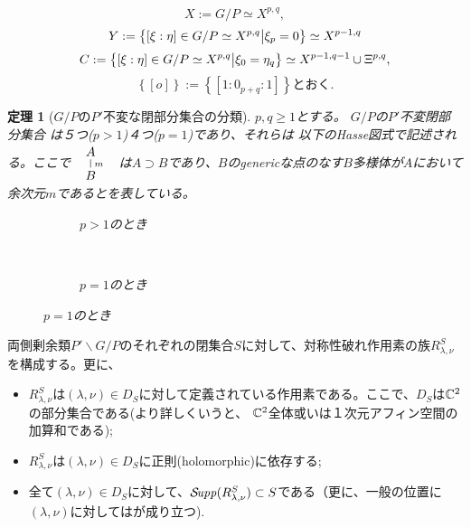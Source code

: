 \documentclass[12pt]{article} %
\newtheorem{theorem}{定理}
\newcommand{\Supp}{\mathcal{S}\!{\it upp}}
\theoremstyle{definition}
\theoremstyle{exampstyle} \newtheorem{examp}[theorem]{Theorem}
\newcommand{\doubt}[1]{\uwave{#1}}
\begin{document}
\[
X:=G/P\simeq X^{p,q},\]\[Y:=\left\{[\xi:\eta]\in G/P\simeq X^{p,q}\big| \xi_{p}=0\right\}\simeq X^{p-1,q}\]
\[C:=\left\{[\xi:\eta]\in G/P\simeq X^{p,q}\big| \xi_{0}=\eta_q\right\}\simeq X^{p-1,q-1}\cup\Xi^{p,q},\]\[\left\{ [o] \right\}:=\left\{ [1:0_{p+q}:1] \right\}\mbox{とおく.}\]
\begin{theorem}[$G/P$の$P'$不変な閉部分集合の分類]
	$p,q\ge1$とする。
	$G/P$の$P'$不変閉部分集合
は５つ($p>1$)\doubt{または}４つ($p=1$)であり、それらは
以下のHasse図式で記述される。ここで
	$
	\begin{array}{l}
	        \xymatrixrowsep{0.5pc}
		\xymatrix{A\ar@{-}[d]^m\\B}
	\end{array}
	$
	は$A\supset B$であり、$B$のgenericな点のなす$B$多様体が$A$において余次元$m$であるとを表している。\\
  \begin{figure}[H]
    \centering
    \begin{subfigure}[t]{0.3\textwidth}
	    \xymatrixrowsep{0.5pc}
	\caption{$p>1$のとき}
    \end{subfigure}
    ~ %
    \begin{subfigure}[t]{0.3\textwidth}
	    \xymatrixrowsep{0.5pc}
	    {}
	\caption{$p=1$のとき}
    \end{subfigure}
\end{figure}
\end{theorem}
両側剰余類$P'\backslash G/P$のそれぞれの閉集合$S$に対して、対称性破れ作用素の族$R^S_{\lambda,\nu}$を構成する。更に、
\begin{itemize}
	\item $R_{\lambda,\nu}^S$は$(\lambda,\nu)\in D_S$に対して定義されている作用素である。ここで、$D_S$は$\mathbb{C}^2$の部分集合である(より詳しくいうと、
		$\mathbb{C}^2$全体或いは１次元アフィン空間の加算和である);
	\item $R_{\lambda,\nu}^S$は$(\lambda,\nu)\in D_S$に正則(holomorphic)に依存する;
	\item 全て$(\lambda,\nu)\in D_S$に対して、$\Supp(R_{\lambda,\nu}^S)\subset S$である（更に、一般の位置に\doubt{ある}$(\lambda,\nu)$に対しては\doubt{等号}が成り立つ).
\end{itemize}
\end{document}
